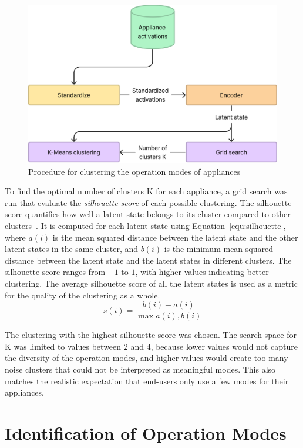 \begin{figure}
    \centering
    \includegraphics[width=.5\linewidth]{images/clustering.png}
    \caption{Procedure for clustering the operation modes of appliances}
    \label{fig:clustering}
\end{figure}

To find the optimal number of clusters K for each appliance, a grid search was run that evaluate the \textit{silhouette score} of each possible clustering. The silhouette score quantifies how well a latent state belongs to its cluster compared to other clusters~\parencite{rousseeuw_silhouettes_1987}. It is computed for each latent state using Equation~\eqref{equ:silhouette}, where $a(i)$ is the mean squared distance between the latent state and the other latent states in the same cluster, and $b(i)$ is the minimum mean squared distance between the latent state and the latent states in different clusters. The silhouette score ranges from $-1$ to $1$, with higher values indicating better clustering. The average silhouette score of all the latent states is used as a metric for the quality of the clustering as a whole.
\begin{equation}\label{equ:silhouette}
s(i) = \frac{b(i) - a(i)}{\max{a(i), b(i)}}
\end{equation}

The clustering with the highest silhouette score was chosen. The search space for K was limited to values between $2$ and $4$, because lower values would not capture the diversity of the operation modes, and higher values would create too many noise clusters that could not be interpreted as meaningful modes. This also matches the realistic expectation that end-users only use a few modes for their appliances.

\section{Identification of Operation Modes}

